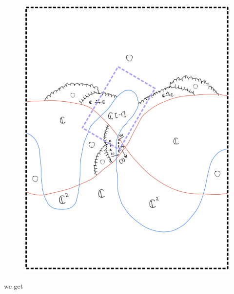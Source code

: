 \begin{enumerate}[label=(Step \arabic*)]
\begin{figure}[H]
    \centering
    \includegraphics[scale = 0.85]{diagrams/cobord8/6.png}
    \caption{}
    \label{fig:your-label}
\end{figure}
\pagebreak
we get
\begin{figure}[H]
    \centering

\end{figure}
\end{enumerate}
